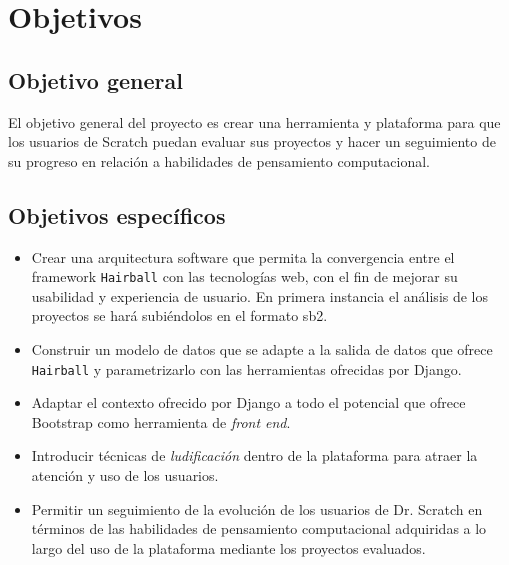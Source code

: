 \documentclass[a4paper, 12pt]{book}
\begin{document}
\cleardoublepage
\chapter{Objetivos}
\label{chap:objetivos}

\section{Objetivo general}
\label{sec:objetivo-general}

El objetivo general del proyecto es crear una herramienta y plataforma para que los
usuarios de Scratch puedan evaluar sus proyectos y hacer un seguimiento de su progreso
en relación a habilidades de pensamiento computacional.


\section{Objetivos específicos}
\label{sec:objetivos-especificos}

\begin{itemize}
  \item Crear una arquitectura software que permita la convergencia entre el framework \texttt{Hairball}
  con las tecnologías web, con el fin de mejorar su usabilidad y experiencia de usuario. En 
	primera instancia el análisis de los proyectos se hará subiéndolos en el formato sb2.
  \item Construir un modelo de datos que se adapte a la salida de datos que ofrece \texttt{Hairball} y
  parametrizarlo con las herramientas ofrecidas por Django.
  \item Adaptar el contexto ofrecido por Django a todo el potencial que ofrece Bootstrap como
  herramienta de \emph{front end}.
  \item Introducir técnicas de \emph{ludificación} dentro de la plataforma para atraer la atención y
  uso de los usuarios.
	\item Permitir un seguimiento de la evolución de los usuarios de Dr. Scratch en términos de 
	las habilidades de pensamiento computacional adquiridas a lo largo del uso de la plataforma
	mediante los proyectos evaluados.
\end{itemize}


\end{document}
